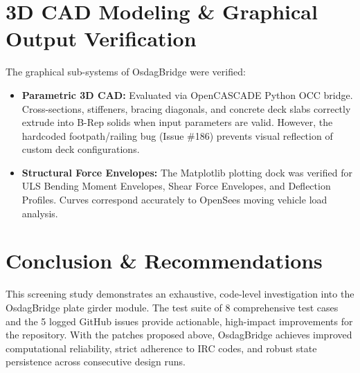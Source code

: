 \documentclass[11pt,a4paper]{article}
\begin{document}
\section{3D CAD Modeling \& Graphical Output Verification}
The graphical sub-systems of OsdagBridge were verified:
\begin{itemize}[noitemsep,topsep=2pt]
    \item \textbf{Parametric 3D CAD:} Evaluated via OpenCASCADE Python OCC bridge. Cross-sections, stiffeners, bracing diagonals, and concrete deck slabs correctly extrude into B-Rep solids when input parameters are valid. However, the hardcoded footpath/railing bug (Issue \#186) prevents visual reflection of custom deck configurations.
    \item \textbf{Structural Force Envelopes:} The Matplotlib plotting dock was verified for ULS Bending Moment Envelopes, Shear Force Envelopes, and Deflection Profiles. Curves correspond accurately to OpenSees moving vehicle load analysis.
\end{itemize}

\section{Conclusion \& Recommendations}
This screening study demonstrates an exhaustive, code-level investigation into the OsdagBridge plate girder module. The test suite of 8 comprehensive test cases and the 5 logged GitHub issues provide actionable, high-impact improvements for the repository. With the patches proposed above, OsdagBridge achieves improved computational reliability, strict adherence to IRC codes, and robust state persistence across consecutive design runs.
\end{document}
